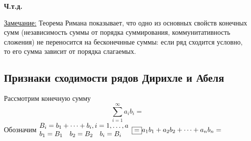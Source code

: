 \documentclass[12pt]{article}
\let\oldsum\sum
\renewcommand{\sum}{\oldsum\limits}
\begin{document}
  \begin{center}
    \textbf{Ч.т.д.}
  \end{center}

  \underline{Замечание:} Теорема Римана показывает, что одно из основных свойств конечных сумм
  (независимость суммы от порядка суммирования, коммунитативность сложения) не переносится на бесконечнные суммы:
  если ряд сходится условно, то его сумма зависит от порядка слагаемых.

  \subsection{Признаки сходимости рядов Дирихле и Абеля}
  Рассмотрим конечную сумму
  \[\sum_{i=1}^{\infty} a_i b_i \boxed{=} \]
  Обозначим $
  \begin{matrix}
    B_i=b_1+\dots+b_i, i=1,\dots,a\\
    b_1=B_1 \hspace{10pt} b_2=B_2 \hspace{10pt} b_i=B_i \hspace{10pt}
  \end{matrix}\\
  \boxed{=} a_1b_1+a_2b_2+\dots+a_nb_n=
  $
\end{document}
